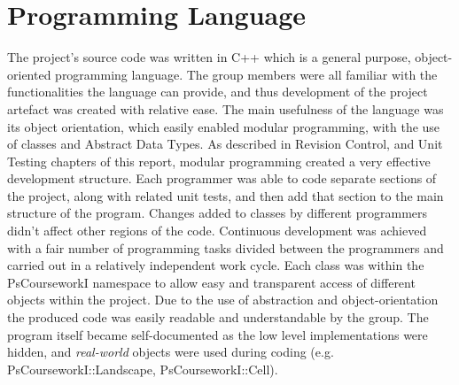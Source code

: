 \section{Programming Language}
\label{Programming Language}
The project's source code was written in C++ which is a general purpose, object-oriented programming language. The group members were all familiar with the functionalities the language can provide, and thus development of the project artefact was created with relative ease. The main usefulness of the language was its object orientation, which easily enabled modular programming, with the use of classes and Abstract Data Types. 
As described in Revision Control, and Unit Testing chapters of this report, modular programming created a very effective development structure. Each programmer was able to code separate sections of the project, along with related unit tests, and then add that section to the main structure of the program. Changes added to classes by different programmers didn't affect other regions of the code. Continuous development was achieved with a fair number of programming tasks divided between the programmers and carried out in a relatively independent work cycle.
Each class was within the PsCourseworkI namespace to allow easy and transparent access of different objects within the project. Due to the use of abstraction and object-orientation the produced code was easily readable and understandable by the group. The program itself became self-documented as the low level implementations were hidden, and \textit{real-world} objects were used during coding (e.g. PsCourseworkI::Landscape, PsCourseworkI::Cell).
